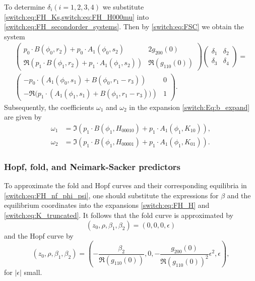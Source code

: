 To determine $\delta_i(i=1,2,3,4)$ we substitute \cref{switch:eq:FH_Ks,switch:eq:FH_H000mu} into \cref{switch:eq:FH_secondorder_systems}. Then by \cref{switch:eq:FSC} we obtain the system
\begin{multline*}
\begin{pmatrix}
p_{0} \cdot B(\phi_{0},r_{2})+p_{0} \cdot A_{1}(\phi_{0},s_{2}) & 2 g_{200}(0)\\
\Re(p_{1} \cdot B(\phi_{1},r_{2})+p_{1} \cdot A_{1}(\phi_{1},s_{2})) & \Re(g_{110}(0))
\end{pmatrix} \begin{pmatrix}
\delta_{1} & \delta_2\\
\delta_{3} & \delta_4
\end{pmatrix} = \\ \begin{pmatrix}
-p_{0} \cdot \left(A_{1}(\phi_{0},s_{1})+B(\phi_{0},r_{1}-r_3)\right)		& 0\\
-\Re(p_{1} \cdot \left(A_{1}(\phi_{1},s_{1})+B(\phi_{1},r_{1}-r_3))\right)	& 1
\end{pmatrix}.
\end{multline*}
Subsequently, the coefficients $\omega_{1}$ and $\omega_{2}$ in the expansion \cref{switch:Eq:b_expand}
are given by
\begin{align*}
\omega_{1} & =\Im\left(p_{1} \cdot B(\phi_{1},H_{00010})+p_{1} \cdot A_{1}(\phi_{1},K_{10})\right),\\
\omega_{2} & =\Im\left(p_{1} \cdot B(\phi_{1},H_{00001})+p_{1} \cdot A_{1}(\phi_{1},K_{01})\right).
\end{align*}

\subsubsection{Hopf, fold, and Neimark-Sacker predictors} \label{switch:sec:fold-Hopf_predictors}
To approximate the fold and Hopf curves and their corresponding equilibria in \cref{switch:eq:FH_nf_phi_psi}, one should substitute the expressions for $\beta$ and the equilibrium coordinates into the expansions \cref{switch:eq:FH_H} and \cref{switch:eq:K_truncated}. It follows that the fold curve is approximated by
\[
\left(z_0,\rho,\beta_{1},\beta_{2}\right)=\left(0,0,0,\epsilon\right)
\]
and the Hopf curve by
\[
\left(z_0,\rho,\beta_{1},\beta_{2}\right)=\left(-\frac{\beta_{2}}{\Re(g_{110}(0))},0,-\frac{g_{200}(0)}{\Re(g_{110}(0))^{2}}\epsilon^{2},\epsilon\right),
\]
for $|\epsilon|$ small. 

